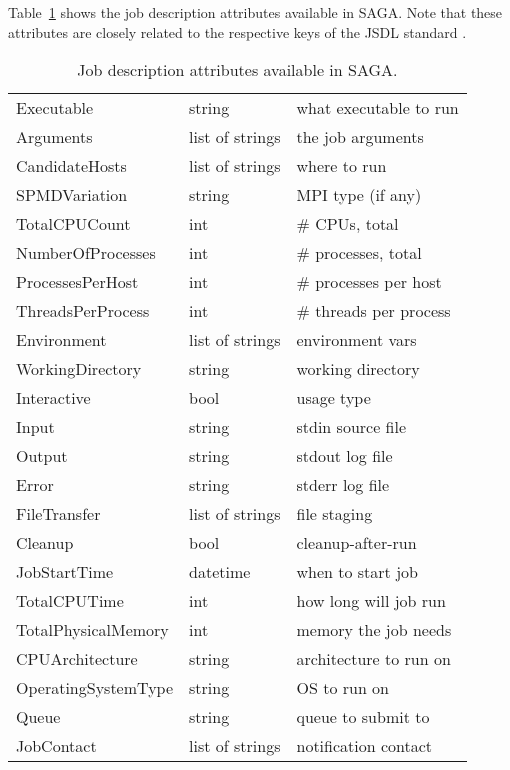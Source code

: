   Table~\ref{tab:jdattribs} shows the job description attributes
  available in SAGA.  Note that these attributes are closely related
  to the respective keys of the JSDL standard
  \cite{jsdl-spec,jsdl-spmd}.

  \UndefineShortVerb{\|}
  
  \begin{table}[h!]
   \centering
   \begin{tabular}{|l|l|l|}
    \hline
      Executable          & string          & what executable to run \\
      Arguments           & list of strings & the job arguments      \\
      CandidateHosts      & list of strings & where to run           \\
      SPMDVariation       & string          & MPI type (if any)      \\
      TotalCPUCount       & int             & \# CPUs, total         \\
      NumberOfProcesses   & int             & \# processes, total    \\
      ProcessesPerHost    & int             & \# processes per host  \\
      ThreadsPerProcess   & int             & \# threads per process \\
      Environment         & list of strings & environment vars       \\
      WorkingDirectory    & string          & working directory      \\
      Interactive         & bool            & usage type             \\
      Input               & string          & stdin source file      \\
      Output              & string          & stdout log file        \\
      Error               & string          & stderr log file        \\
      FileTransfer        & list of strings & file staging           \\
      Cleanup             & bool            & cleanup-after-run      \\
      JobStartTime        & datetime        & when to start job      \\
      TotalCPUTime        & int             & how long will job run  \\
      TotalPhysicalMemory & int             & memory the job needs   \\
      CPUArchitecture     & string          & architecture to run on \\
      OperatingSystemType & string          & OS to run on           \\
      Queue               & string          & queue to submit to     \\
      JobContact          & list of strings & notification contact   \\
    \hline
   \end{tabular}
   \caption{Job description attributes available in SAGA.}
   \label{tab:jdattribs}
   \end{table}

